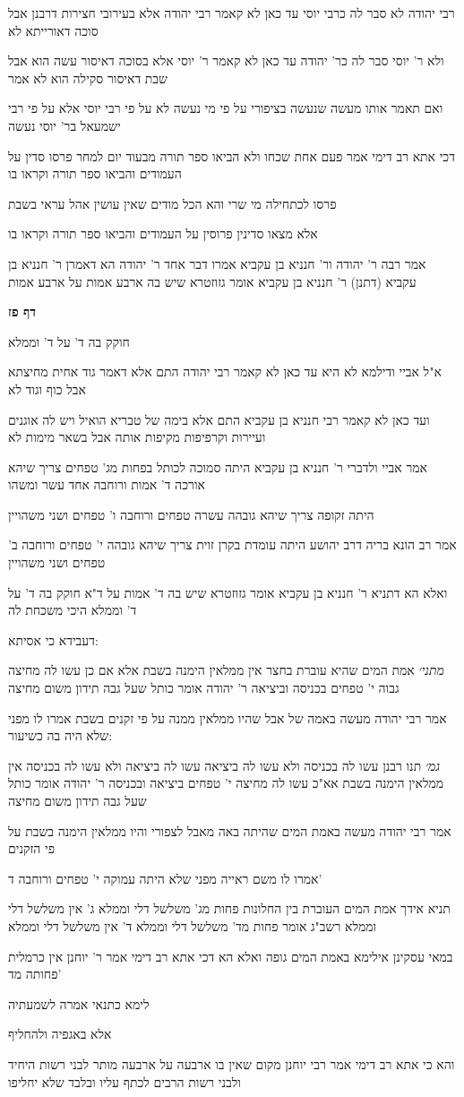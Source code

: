 \documentclass[12pt, openany]{book}
\newcommand{\sethebfont}{
\fontsize{10.5pt}{21.0pt} \selectfont
}
\newcommand{\textblock}[1]{
{\sethebfont #1\\}	
}
\newcommand{\sectname}{}
\newcommand{\newsection}[1]{
	\addcontentsline{toc}{section}{#1}
	\renewcommand{\sectname}{#1}	
	\vspace{-\baselineskip}
	\begin{center}
		\textbf{%
\fontsize{16pt}{16pt}\selectfont
			#1}
	\end{center}
	\vspace{-\baselineskip}
	\nopagebreak
}
\begin{document}
\textblock{רבי יהודה לא סבר לה כרבי יוסי עד כאן לא קאמר רבי יהודה אלא בעירובי חצירות דרבנן אבל סוכה דאורייתא לא}
\textblock{ולא ר' יוסי סבר לה כר' יהודה עד כאן לא קאמר ר' יוסי אלא בסוכה דאיסור עשה הוא אבל שבת דאיסור סקילה הוא לא אמר}
\textblock{ואם תאמר אותו מעשה שנעשה בציפורי על פי מי נעשה לא על פי רבי יוסי אלא על פי רבי ישמעאל בר' יוסי נעשה}
\textblock{דכי אתא רב דימי אמר פעם אחת שכחו ולא הביאו ספר תורה מבעוד יום למחר פרסו סדין על העמודים והביאו ספר תורה וקראו בו}
\textblock{פרסו לכתחילה מי שרי והא הכל מודים שאין עושין אהל עראי בשבת}
\textblock{אלא מצאו סדינין פרוסין על העמודים והביאו ספר תורה וקראו בו}
\textblock{אמר רבה ר' יהודה ור' חנניא בן עקביא אמרו דבר אחד ר' יהודה הא דאמרן ר' חנניא בן עקביא (דתנן) ר' חנניא בן עקביא אומר גזוזטרא שיש בה ארבע אמות על ארבע אמות}
\newsection{דף פז}
\textblock{חוקק בה ד' על ד' וממלא}
\textblock{א"ל אביי ודילמא לא היא עד כאן לא קאמר רבי יהודה התם אלא דאמר גוד אחית מחיצתא אבל כוף וגוד לא}
\textblock{ועד כאן לא קאמר רבי חנניא בן עקביא התם אלא בימה של טבריא הואיל ויש לה אוגנים ועיירות וקרפיפות מקיפות אותה אבל בשאר מימות לא}
\textblock{אמר אביי ולדברי ר' חנניא בן עקביא היתה סמוכה לכותל בפחות מג' טפחים צריך שיהא אורכה ד' אמות ורוחבה אחד עשר ומשהו}
\textblock{היתה זקופה צריך שיהא גובהה עשרה טפחים ורוחבה ו' טפחים ושני משהויין}
\textblock{אמר רב הונא בריה דרב יהושע היתה עומדת בקרן זוית צריך שיהא גובהה י' טפחים ורוחבה ב' טפחים ושני משהויין}
\textblock{ואלא הא דתניא ר' חנניא בן עקביא אומר גזוזטרא שיש בה ד' אמות על ד"א חוקק בה ד' על ד' וממלא היכי משכחת לה}
\textblock{דעבידא כי אסיתא:}
\textblock{{\large\emph{מתני׳}} אמת המים שהיא עוברת בחצר אין ממלאין הימנה בשבת אלא אם כן עשו לה מחיצה גבוה י' טפחים בכניסה וביציאה ר' יהודה אומר כותל שעל גבה תידון משום מחיצה}
\textblock{אמר רבי יהודה מעשה באמה של אבל שהיו ממלאין ממנה על פי זקנים בשבת אמרו לו מפני שלא היה בה כשיעור:}
\textblock{{\large\emph{גמ׳}} תנו רבנן עשו לה בכניסה ולא עשו לה ביציאה עשו לה ביציאה ולא עשו לה בכניסה אין ממלאין הימנה בשבת אא"כ עשו לה מחיצה י' טפחים ביציאה ובכניסה ר' יהודה אומר כותל שעל גבה תידון משום מחיצה}
\textblock{אמר רבי יהודה מעשה באמת המים שהיתה באה מאבל לצפורי והיו ממלאין הימנה בשבת על פי הזקנים}
\textblock{אמרו לו משם ראייה מפני שלא היתה עמוקה י' טפחים ורוחבה ד'}
\textblock{תניא אידך אמת המים העוברת בין החלונות פחות מג' משלשל דלי וממלא ג' אין משלשל דלי וממלא רשב"ג אומר פחות מד' משלשל דלי וממלא ד' אין משלשל דלי וממלא}
\textblock{במאי עסקינן אילימא באמת המים גופה ואלא הא דכי אתא רב דימי אמר ר' יוחנן אין כרמלית פחותה מד'}
\textblock{לימא כתנאי אמרה לשמעתיה}
\textblock{אלא באגפיה ולהחליף}
\textblock{והא כי אתא רב דימי אמר רבי יוחנן מקום שאין בו ארבעה על ארבעה מותר לבני רשות היחיד ולבני רשות הרבים לכתף עליו ובלבד שלא יחליפו}
\end{document}
